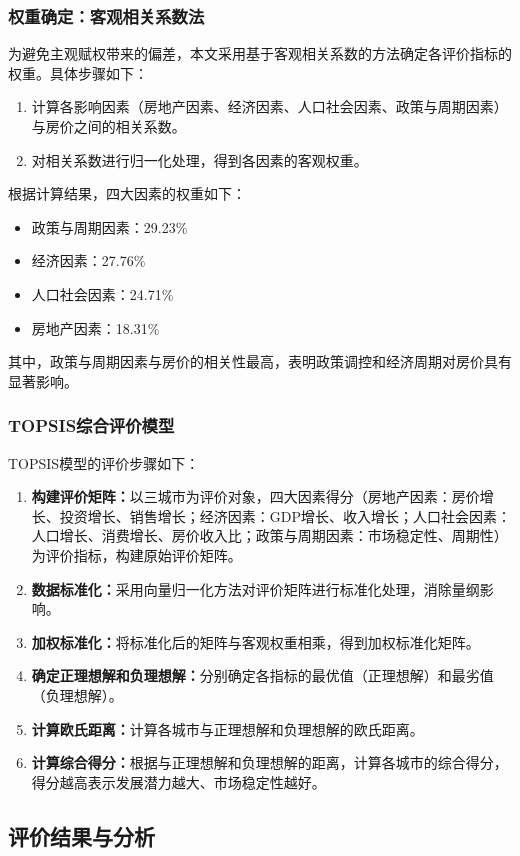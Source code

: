 \documentclass[12pt,a4paper]{article}
\begin{document}
\subsubsection{权重确定：客观相关系数法}
为避免主观赋权带来的偏差，本文采用基于客观相关系数的方法确定各评价指标的权重。具体步骤如下：
\begin{enumerate}
    \item 计算各影响因素（房地产因素、经济因素、人口社会因素、政策与周期因素）与房价之间的相关系数。
    \item 对相关系数进行归一化处理，得到各因素的客观权重。
\end{enumerate}
根据计算结果，四大因素的权重如下：
\begin{itemize}
    \item 政策与周期因素：29.23\%
    \item 经济因素：27.76\%
    \item 人口社会因素：24.71\%
    \item 房地产因素：18.31\%
\end{itemize}
其中，政策与周期因素与房价的相关性最高，表明政策调控和经济周期对房价具有显著影响。

\subsubsection{TOPSIS综合评价模型}
TOPSIS模型的评价步骤如下：
\begin{enumerate}
    \item \textbf{构建评价矩阵：}以三城市为评价对象，四大因素得分（房地产因素：房价增长、投资增长、销售增长；经济因素：GDP增长、收入增长；人口社会因素：人口增长、消费增长、房价收入比；政策与周期因素：市场稳定性、周期性）为评价指标，构建原始评价矩阵。
    \item \textbf{数据标准化：}采用向量归一化方法对评价矩阵进行标准化处理，消除量纲影响。
    \item \textbf{加权标准化：}将标准化后的矩阵与客观权重相乘，得到加权标准化矩阵。
    \item \textbf{确定正理想解和负理想解：}分别确定各指标的最优值（正理想解）和最劣值（负理想解）。
    \item \textbf{计算欧氏距离：}计算各城市与正理想解和负理想解的欧氏距离。
    \item \textbf{计算综合得分：}根据与正理想解和负理想解的距离，计算各城市的综合得分，得分越高表示发展潜力越大、市场稳定性越好。
\end{enumerate}

\subsection{评价结果与分析}
\end{document}
